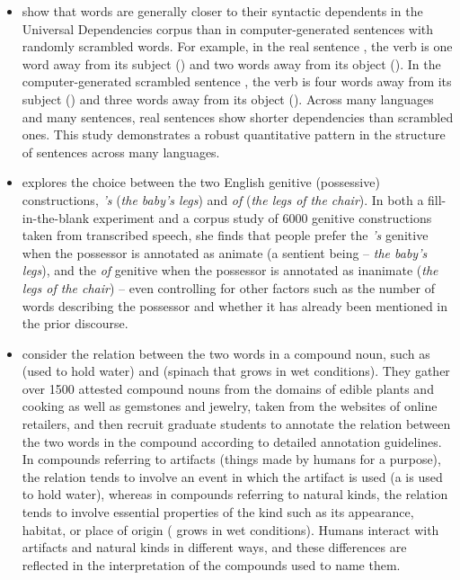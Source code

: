 \begin{itemize}

\item  \citet{Futrell-etal:2015}  show that words are generally closer to their syntactic dependents in the Universal Dependencies corpus than in computer-generated sentences with randomly scrambled words.  For example, in the real sentence , the verb  is one word away from its subject () and two words away from its object ().  In the computer-generated scrambled sentence ,  the verb  is four words away from its subject () and three words away from its object ().  Across many languages and many sentences, real sentences show shorter dependencies than scrambled ones.  This study demonstrates a robust quantitative pattern in the structure of sentences across many languages.


\item \citet{Rosenbach:2005} explores the choice between the two
English genitive (possessive) constructions, \textit{'s} (\textit{the
baby's legs}) and \textit{of} (\textit{the legs of the chair}).  In
both a fill-in-the-blank experiment and a corpus study of 6000
genitive constructions taken from transcribed speech, she finds that
people prefer the \textit{'s} genitive when the possessor is annotated as animate
(a sentient being -- \textit{the baby's legs}), and the \textit{of}
genitive when the possessor is annotated as inanimate (\textit{the legs of the
chair}) -- even controlling for other factors such as the number of
words describing the possessor and whether it has already been mentioned in
the prior discourse.  


\item \citet{Levin-etal:2019} consider the relation between the two
words in a compound noun, such as  (used to hold
water) and  (spinach that grows in wet
conditions).  They gather over 1500 attested compound nouns from the
domains of edible plants and cooking as well as gemstones and jewelry, taken from the
websites of online retailers, and then recruit graduate students to
annotate the relation between the two words in the compound according
to detailed annotation guidelines.  In compounds referring to artifacts (things made
by humans for a purpose), the relation tends to involve an event in
which the artifact is used (a  is used to hold water),
whereas in compounds referring to natural kinds, the relation tends to
involve essential properties of the kind such as its appearance,
habitat, or place of origin ( grows in wet conditions).  Humans
interact with artifacts and natural kinds in different ways, and these
differences are reflected in the interpretation of the compounds used
to name them.


\end{itemize}
